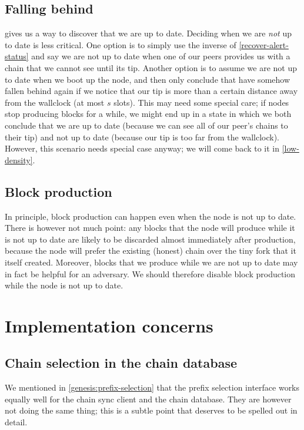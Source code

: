 \subsection{Falling behind}

 gives us a way to discover that we are up to date.
Deciding when we are \emph{not} up to date is less critical. One option is to
simply use the inverse of \cref{recover-alert-status} and say we are not up to
date when one of our peers provides us with a chain that we cannot see until its
tip.  Another option is to assume we are not up to date when we boot up the
node, and then only conclude that have somehow fallen behind again if we notice
that our tip is more than a certain distance away from the wallclock (at most
$s$ slots). This may need some special care; if nodes stop producing blocks for
a while, we might end up in a state in which we both conclude that we are up to
date (because we can see all of our peer's chains to their tip) and not up to
date (because our tip is too far from the wallclock). However, this scenario
needs special case anyway; we will come back to it in \cref{low-density}.

\subsection{Block production}

In principle, block production can happen even when the node is not up to date.
There is however not much point: any blocks that the node will produce while it
is not up to date are likely to be discarded almost immediately after
production, because the node will prefer the existing (honest) chain over the
tiny fork that it itself created. Moreover, blocks that we produce while we are
not up to date may in fact be helpful for an adversary. We should therefore
disable block production while the node is not up to date.

\section{Implementation concerns}

\subsection{Chain selection in the chain database}
\label{genesis:chain-database}

We mentioned in \cref{genesis:prefix-selection} that the prefix selection
interface works equally well for the chain sync client and the chain database.
They are however not doing the same thing; this is a subtle point that deserves
to be spelled out in detail.

